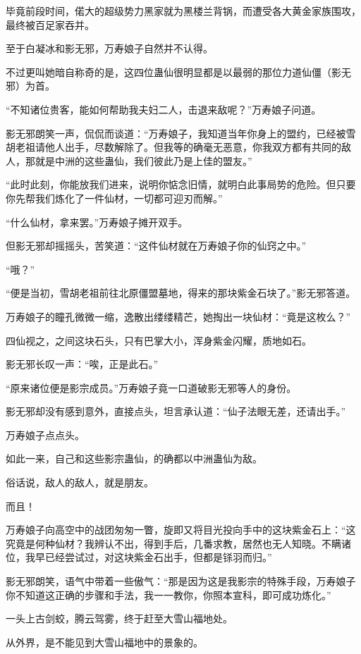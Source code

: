 \begin{this_body}
毕竟前段时间，偌大的超级势力黑家就为黑楼兰背锅，而遭受各大黄金家族围攻，最终被百足家吞并。

至于白凝冰和影无邪，万寿娘子自然并不认得。

不过更叫她暗自称奇的是，这四位蛊仙很明显都是以最弱的那位力道仙僵（影无邪）为首。

“不知诸位贵客，能如何帮助我夫妇二人，击退来敌呢？”万寿娘子问道。

影无邪朗笑一声，侃侃而谈道：“万寿娘子，我知道当年你身上的盟约，已经被雪胡老祖请他人出手，尽数解除了。但我等的确毫无恶意，你我双方都有共同的敌人，那就是中洲的这些蛊仙，我们彼此乃是上佳的盟友。”

“此时此刻，你能放我们进来，说明你惦念旧情，就明白此事局势的危险。但只要你先帮我们炼化了一件仙材，一切都可迎刃而解。”

“什么仙材，拿来罢。”万寿娘子摊开双手。

但影无邪却摇摇头，苦笑道：“这件仙材就在万寿娘子你的仙窍之中。”

“哦？”

“便是当初，雪胡老祖前往北原僵盟墓地，得来的那块紫金石块了。”影无邪答道。

万寿娘子的瞳孔微微一缩，逸散出缕缕精芒，她掏出一块仙材：“竟是这枚么？”

四仙视之，之间这块石头，只有巴掌大小，浑身紫金闪耀，质地如石。

影无邪长叹一声：“唉，正是此石。”

“原来诸位便是影宗成员。”万寿娘子竟一口道破影无邪等人的身份。

影无邪却没有感到意外，直接点头，坦言承认道：“仙子法眼无差，还请出手。”

万寿娘子点点头。

如此一来，自己和这些影宗蛊仙，的确都以中洲蛊仙为敌。

俗话说，敌人的敌人，就是朋友。

而且！

万寿娘子向高空中的战团匆匆一瞥，旋即又将目光投向手中的这块紫金石上：“这究竟是何种仙材？我辨认不出，得到手后，几番求教，居然也无人知晓。不瞒诸位，我早已经尝试过，对这块紫金石出手，但都是铩羽而归。”

影无邪朗笑，语气中带着一些傲气：“那是因为这是我影宗的特殊手段，万寿娘子你不知道这正确的步骤和手法，我一一教你，你照本宣科，即可成功炼化。”

一头上古剑蛟，腾云驾雾，终于赶至大雪山福地处。

从外界，是不能见到大雪山福地中的景象的。


\end{this_body}
